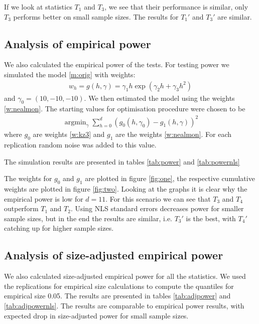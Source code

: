 \documentclass{article}
\DeclareMathOperator{\argmin}{argmin}
\begin{document}
If we look at statistics $T_1$ and $T_3$, we see that their
performance is similar, only $T_3$ performs better on small sample
sizes. The results for $T_1'$ and $T_3'$ are similar.

\subsection{Analysis of empirical power}

We also calculated the empirical power of the tests. For testing power
we simulated the model \eqref{m:orig} with weights:
\begin{align}\label{w:kz3}
  w_h=g(h,\gamma)=\gamma_1h\exp(\gamma_2h+\gamma_3h^2)
\end{align}
and $\gamma_0=(10,-10,-10)$. We then estimated the model using the
weights \eqref{w:nealmon}. The starting values for optimisation
procedure were chosen to be 
\begin{align*}
  \argmin_{\gamma}\sum_{h=0}^d(g_0(h,\gamma_0)-g_1(h,\gamma))^2
\end{align*}
where $g_0$ are weights \eqref{w:kz3} and $g_1$ are the weights
\eqref{w:nealmon}. For each replication random noise was added to this value.

The simulation results are presented in tables \ref{tab:power} and \ref{tab:powernls}

The weights for $g_0$ and $g_1$ are plotted in figure \ref{fig:one}, the
respective cumulative weights are plotted in figure
\ref{fig:two}. Looking at the graphs it is clear why the empirical
power is low for $d=11$.  For this scenario we can see that $T_3$ and
$T_4$ outperform $T_1$ and $T_2$. Using NLS standard errors decreases
power for smaller sample sizes, but in the end the results are
similar, i.e. $T_3'$ is the best, with $T_4'$ catching up for higher
sample sizes. 

\subsection{Analysis of size-adjusted empirical power}

We also calculated size-adjusted empirical power for all the
statistics. We used the replications for empirical size calculations
to compute the quantiles for empirical size 0.05. The results are
presented in tables  \ref{tab:adjpower} and \ref{tab:adjpowernls}. The
results are comparable to empirical power results, with expected drop
in size-adjusted power for small sample sizes.
\end{document}
